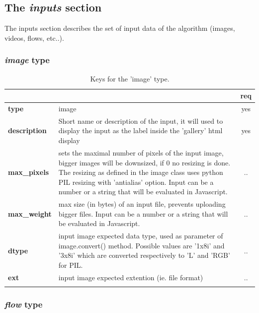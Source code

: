\subsection{The \emph{inputs} section}
The inputs section describes the set of input data of the algorithm (images, 
videos, flows, etc..).

\subsubsection{\emph{image} type}

\begin{longtable}{|>{\bf}L{\linewidth}|L{\linewidth}|c|}
\hline
{}     &  & {\bf req} \tabularnewline 
\hline \hline
 type         & image & yes \\ \hline
 description  & Short name or description of the input, it will used to display 
the input as the label inside the 'gallery' html display & yes \\ \hline
 max\_pixels   &  sets the maximal number of pixels of the input image, 
bigger images will be downsized, if 0 no resizing is done. The resizing as 
defined in the image class uses python PIL resizing with 'antialias' option. 
Input can be a number or a string that will be evaluated in Javascript.  & .. \\ \hline
 max\_weight   & max size (in bytes) of an input file, prevents uploading 
bigger files. Input can be a number or a string that will be evaluated in Javascript. & .. \\ \hline
 dtype        & input image expected data type, used as parameter of 
image.convert() method. Possible values are '1x8i' and '3x8i' which are 
converted respectively to 'L' and 'RGB' for PIL. & .. \\ \hline
 ext          & input image expected extention (ie. file format) & .. \\ \hline
\caption{Keys for the 'image' type.}
\end{longtable}

\subsubsection{\emph{flow} type}



